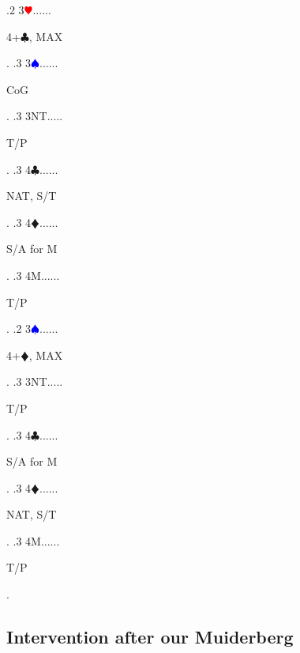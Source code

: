 \documentclass[a4paper]{article}
\newcommand{\BC}{\textcolor{OliveGreen}{$\clubsuit$}}
\newcommand{\BD}{\textcolor{RedOrange}{$\vardiamondsuit$}}
\newcommand{\BH}{\textcolor{Red}{$\varheartsuit${}}}
\newcommand{\BS}{\textcolor{Blue}{$\spadesuit${}}}
\begin{document}
{ .2 3\BH......\begin{minipage}[t]{0.8\textwidth}
4+\BC , MAX
\end{minipage}. 
 .3 3\BS......\begin{minipage}[t]{0.8\textwidth}
CoG
\end{minipage}. 
 .3 3NT.....\begin{minipage}[t]{0.8\textwidth}
T/P
\end{minipage}. 
 .3 4\BC......\begin{minipage}[t]{0.8\textwidth}
NAT, S/T
\end{minipage}. 
 .3 4\BD......\begin{minipage}[t]{0.8\textwidth}
S/A for M
\end{minipage}. 
 .3 4M......\begin{minipage}[t]{0.8\textwidth}
T/P
\end{minipage}. 
 .2 3\BS......\begin{minipage}[t]{0.8\textwidth}
4+\BD , MAX
\end{minipage}. 
 .3 3NT.....\begin{minipage}[t]{0.8\textwidth}
T/P
\end{minipage}. 
 .3 4\BC......\begin{minipage}[t]{0.8\textwidth}
S/A for M
\end{minipage}. 
 .3 4\BD......\begin{minipage}[t]{0.8\textwidth}
NAT, S/T
\end{minipage}. 
 .3 4M......\begin{minipage}[t]{0.8\textwidth}
T/P
\end{minipage}. 
}
\bigbreak
\subsection{Intervention after our Muiderberg}
\end{document}
